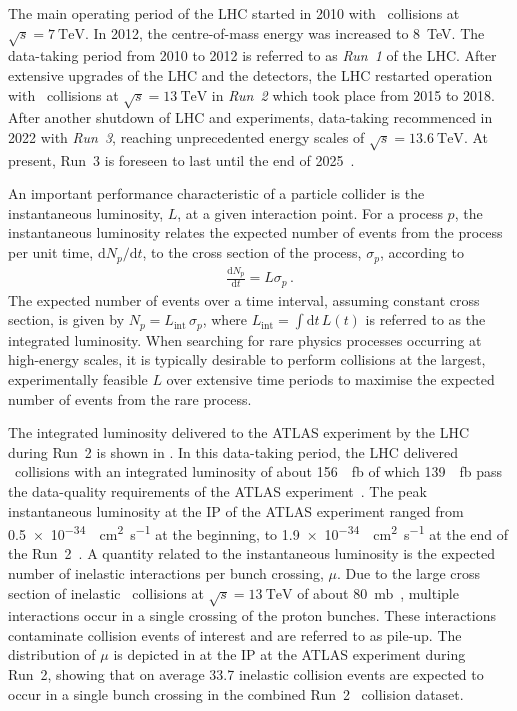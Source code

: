 The main operating period of the LHC started in 2010 with \pp~collisions at
$\sqrt{s} = \SI{7}{\TeV}$. In 2012, the centre-of-mass energy was increased to
\SI{8}{\TeV}. The data-taking period from 2010 to 2012 is referred to as
\emph{Run~1} of the LHC. After extensive upgrades of the LHC and the detectors,
the LHC restarted operation with \pp~collisions at $\sqrt{s} = \SI{13}{\TeV}$ in
\emph{Run~2} which took place from 2015 to 2018. After another shutdown of LHC
and experiments, data-taking recommenced in 2022 with \emph{Run~3}, reaching
unprecedented energy scales of $\sqrt{s} = \SI{13.6}{\TeV}$. At present, Run~3
is foreseen to last until the end of 2025~\cite{lhc_schedule}.

An important performance characteristic of a particle collider is the
instantaneous luminosity, $L$, at a given interaction point. For a process $p$,
the instantaneous luminosity relates the expected number of events from the
process per unit time, $\mathrm{d}N_{p} / \mathrm{d}t$, to the cross section of
the process, $\sigma_{p}$, according to
\begin{align*}
  \frac{\mathrm{d}N_{p}}{\mathrm{d}t} = L \sigma_{p} \,\text{.}
\end{align*}
The expected number of events over a time interval, assuming constant
cross section, is given by $N_{p} = L_{\text{int}} \, \sigma_{p}$, where
$L_{\text{int}} = \int \mathrm{d}t \, L(t)$ is referred to as the integrated
luminosity. When searching for rare physics processes occurring at high-energy
scales, it is typically desirable to perform collisions at the largest,
experimentally feasible $L$ over extensive time periods to maximise the expected
number of events from the rare process.

The integrated luminosity delivered to the ATLAS experiment by the LHC during
Run~2 is shown in . In this data-taking period,
the LHC delivered \pp~collisions with an integrated luminosity of about
\SI{156}{\per\femto\barn} of which \SI{139}{\per\femto\barn} pass the
data-quality requirements of the ATLAS experiment~\cite{ATLAS-CONF-2019-021}.
The peak instantaneous luminosity at the IP of the ATLAS experiment ranged from
\SI{0.5e-34}{\per\centi\metre\squared\per\second} at the beginning, to
\SI{1.9e-34}{\per\centi\metre\squared\per\second} at the end of the
Run~2~\cite{ATLAS-CONF-2019-021}. A quantity related to the instantaneous
luminosity is the expected number of inelastic \pp interactions per bunch
crossing, $\mu$. Due to the large cross section of inelastic \pp~collisions at
$\sqrt{s} = \SI{13}{\TeV}$ of about \SI{80}{\milli\barn}~\cite{STDM-2015-05},
multiple interactions occur in a single crossing of the proton bunches. These
interactions contaminate collision events of interest and are referred to as
pile-up. The distribution of $\mu$ is depicted in  at the IP
at the ATLAS experiment during Run~2, showing that on average \num{33.7}
inelastic collision events are expected to occur in a single bunch crossing in
the combined Run~2 \pp~collision dataset.


